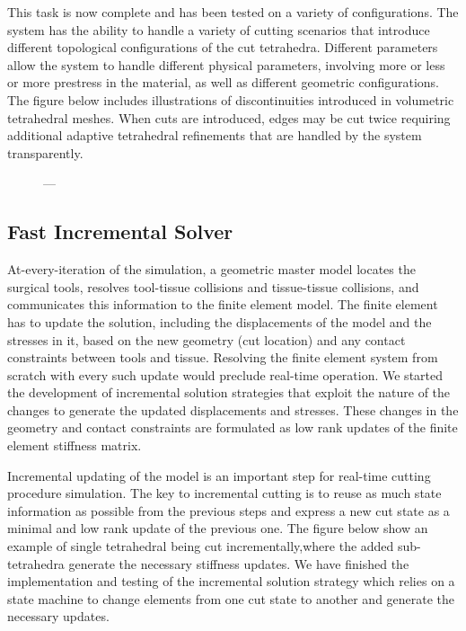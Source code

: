 This task is now complete and has been tested on a variety of configurations. The system has the ability to handle a variety of cutting scenarios that introduce different topological configurations of the cut tetrahedra. Different parameters allow the system to handle different physical parameters, involving more or less or more prestress in the material, as well as different geometric configurations. The figure below includes illustrations of discontinuities introduced in volumetric tetrahedral meshes.  When cuts are introduced, edges may be cut twice requiring additional adaptive tetrahedral refinements that are handled by the system transparently.

\begin{figure}
  \centering%
  \setlength{\fboxsep}{0pt}%
  \setlength{\fboxrule}{0.1pt}%
  \hfill%
  \hfill%
  \caption{---}\label{fig:cuts}
\end{figure}


\subsection{Fast Incremental Solver}\label{ssec:incremental_solver}
At-every-iteration of the simulation, a geometric master model locates the surgical tools, resolves tool-tissue collisions and tissue-tissue collisions, and communicates this information to the finite element model. The finite element has to update the solution, including the displacements of the model and the stresses in it, based on the new geometry (cut location) and any contact constraints between tools and tissue. Resolving the finite element system from scratch with every such update would preclude real-time operation. We started the development of incremental solution strategies that exploit the nature of the changes to generate the updated displacements and stresses. These changes in the geometry and contact constraints are formulated as low rank updates of the finite element stiffness matrix.

Incremental updating of the model is an important step for real-time cutting procedure simulation. The key to incremental cutting is to reuse as much state information as possible from the previous steps and express a new cut state as a minimal and low rank update of the previous one. The figure below show an example of single tetrahedral being cut incrementally,where the added sub-tetrahedra generate the necessary stiffness updates. We have finished the implementation and testing of the incremental solution strategy which relies on a state machine to change elements from one cut state to another and generate the necessary updates.

